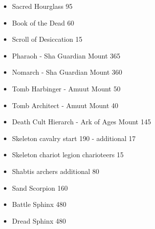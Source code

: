 \subtitle{Points}
\begin{itemize}
\item Sacred Hourglass 95
\item Book of the Dead 60
\item Scroll of Desiccation 15
\item Pharaoh - Sha Guardian Mount 365
\item Nomarch - Sha Guardian Mount 360
\item Tomb Harbinger - Amuut Mount 50
\item Tomb Architect - Amuut Mount 40
\item Death Cult Hierarch - Ark of Ages Mount 145
\item Skeleton cavalry start 190
- additional 17
\item Skeleton chariot legion charioteers 15
\item Shabtis archers additional 80
\item Sand Scorpion 160
\item Battle Sphinx 480
\item Dread Sphinx 480
\end{itemize}